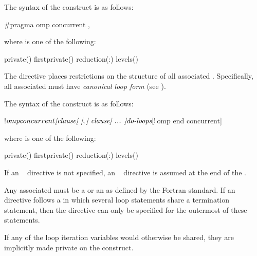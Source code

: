 \syntax
\begin{ccppspecific}
The syntax of the  construct is as follows:
\begin{ompcPragma}
#pragma omp concurrent \plc{[clause[ [},\plc{] clause] ... ] new-line}
\end{ompcPragma}

where  is one of the following:

\begin{indentedcodelist}
private()
firstprivate()
reduction(:)
levels()

\end{indentedcodelist}
The  directive places restrictions on the structure of all associated .
Specifically, all associated  must have \emph{canonical loop form} (see
).
\end{ccppspecific}

\begin{fortranspecific}
The syntax of the  construct is as follows:

\begin{ompfPragma}
!$omp concurrent \plc{[clause[ [},\plc{] clause] ... ]}
   \plc{do-loops}
[!$omp end concurrent]
\end{ompfPragma}

\begin{samepage}
where  is one of the following:

\begin{indentedcodelist}
private()
firstprivate()
reduction(:)
levels()
\end{indentedcodelist}
\end{samepage}

If an ~ directive is not specified, an
  ~ directive is assumed at the end of the
.

Any associated  must be a  or an
 as defined by the Fortran standard. If
an ~ directive follows a  in
which several loop statements share a  termination statement,
then the directive can only be specified for the outermost of these
 statements.

If any of the loop iteration variables would otherwise be shared, they are implicitly
  made private on the  construct.
\end{fortranspecific}

